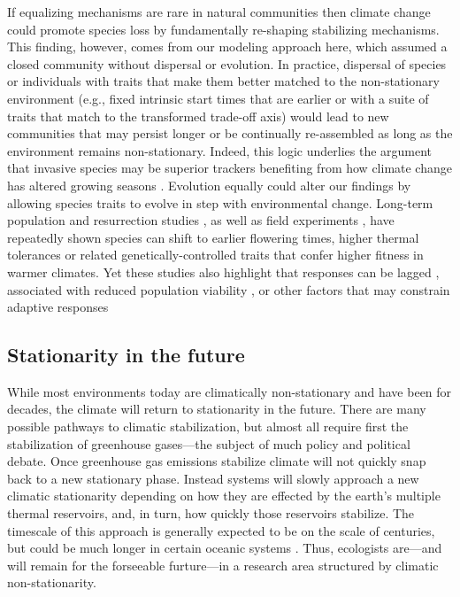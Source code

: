 \documentclass[11pt,letterpaper]{article}
\begin{document}
If equalizing mechanisms are rare in natural communities then climate change could promote species loss by fundamentally re-shaping stabilizing mechanisms. This finding, however, comes from our modeling approach here, which assumed a closed community without  dispersal or evolution. In practice, dispersal of species or individuals with traits that make them better matched to the non-stationary environment (e.g., fixed intrinsic start times that are earlier or with a suite of traits that match to the transformed trade-off axis) would lead to new communities that may persist longer or be continually re-assembled as long as the environment remains non-stationary. Indeed, this logic underlies the argument that invasive species may be superior trackers benefiting from how climate change has altered growing seasons \citep{Willis:2010al,wolkovich:2010fee}. Evolution equally could alter our findings by allowing species traits to evolve in step with environmental change. Long-term population \citep[e.g.,][]{colautti2017} and resurrection studies \citep{wilczek2014,yousey2018}, as well as field experiments \citep{colautti2017,arab2019}, have repeatedly shown species can shift to earlier flowering times, higher thermal tolerances or related genetically-controlled traits that confer higher fitness in warmer climates. Yet these studies also highlight that responses can be lagged \citep[e.g.,][]{wilczek2014}, associated with reduced population viability \citep[e.g.,][]{colautti2017}, or other factors that may constrain adaptive responses

\subsection{Stationarity in the future}

While most environments today are climatically non-stationary and have been for decades, the climate will return to stationarity in the future. There are many possible pathways to climatic stabilization, but almost all require first the stabilization of greenhouse gases---the subject of much policy and political debate. Once greenhouse gas emissions stabilize climate will not quickly snap back to a new stationary phase. Instead systems will slowly approach a new climatic stationarity depending on how they are effected by the earth's multiple thermal reservoirs, and, in turn, how quickly those reservoirs stabilize. The timescale of this approach is generally expected to be on the scale of centuries, but could be much longer in certain oceanic systems \citep{ipcc2013ch12}. Thus, ecologists are---and will remain for the forseeable furture---in a research area structured by climatic non-stationarity. 
\end{document}
